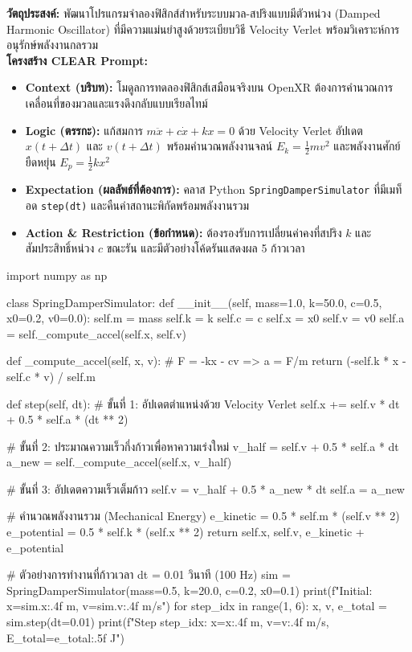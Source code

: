 \begin{aipromptbox}
\textbf{วัตถุประสงค์:} พัฒนาโปรแกรมจำลองฟิสิกส์สำหรับระบบมวล-สปริงแบบมีตัวหน่วง (Damped Harmonic Oscillator) ที่มีความแม่นยำสูงด้วยระเบียบวิธี Velocity Verlet พร้อมวิเคราะห์การอนุรักษ์พลังงานกลรวม\\
\textbf{โครงสร้าง CLEAR Prompt:}
\begin{itemize}[topsep=1pt, itemsep=1pt, leftmargin=1.2em]
    \item \textbf{Context (บริบท):} โมดูลการทดลองฟิสิกส์เสมือนจริงบน OpenXR ต้องการคำนวณการเคลื่อนที่ของมวลและแรงดึงกลับแบบเรียลไทม์
    \item \textbf{Logic (ตรรกะ):} แก้สมการ $m\ddot{x} + c\dot{x} + kx = 0$ ด้วย Velocity Verlet อัปเดต $x(t+\Delta t)$ และ $v(t+\Delta t)$ พร้อมคำนวณพลังงานจลน์ $E_k = \frac{1}{2}mv^2$ และพลังงานศักย์ยืดหยุ่น $E_p = \frac{1}{2}kx^2$
    \item \textbf{Expectation (ผลลัพธ์ที่ต้องการ):} คลาส Python \texttt{SpringDamperSimulator} ที่มีเมท็อด \texttt{step(dt)} และคืนค่าสถานะพิกัดพร้อมพลังงานรวม
    \item \textbf{Action \& Restriction (ข้อกำหนด):} ต้องรองรับการเปลี่ยนค่าคงที่สปริง $k$ และสัมประสิทธิ์หน่วง $c$ ขณะรัน และมีตัวอย่างโค้ดรันแสดงผล 5 ก้าวเวลา
\end{itemize}
\end{aipromptbox}

\begin{codebox}
import numpy as np

class SpringDamperSimulator:
    def __init__(self, mass=1.0, k=50.0, c=0.5, x0=0.2, v0=0.0):
        self.m = mass
        self.k = k
        self.c = c
        self.x = x0
        self.v = v0
        self.a = self._compute_accel(self.x, self.v)

    def _compute_accel(self, x, v):
        # F = -kx - cv => a = F/m
        return (-self.k * x - self.c * v) / self.m

    def step(self, dt):
        # ขั้นที่ 1: อัปเดตตำแหน่งด้วย Velocity Verlet
        self.x += self.v * dt + 0.5 * self.a * (dt ** 2)
        
        # ขั้นที่ 2: ประมาณความเร็วกึ่งก้าวเพื่อหาความเร่งใหม่
        v_half = self.v + 0.5 * self.a * dt
        a_new = self._compute_accel(self.x, v_half)
        
        # ขั้นที่ 3: อัปเดตความเร็วเต็มก้าว
        self.v = v_half + 0.5 * a_new * dt
        self.a = a_new
        
        # คำนวณพลังงานรวม (Mechanical Energy)
        e_kinetic = 0.5 * self.m * (self.v ** 2)
        e_potential = 0.5 * self.k * (self.x ** 2)
        return self.x, self.v, e_kinetic + e_potential

# ตัวอย่างการทำงานที่ก้าวเวลา dt = 0.01 วินาที (100 Hz)
sim = SpringDamperSimulator(mass=0.5, k=20.0, c=0.2, x0=0.1)
print(f"Initial: x={sim.x:.4f} m, v={sim.v:.4f} m/s")
for step_idx in range(1, 6):
    x, v, e_total = sim.step(dt=0.01)
    print(f"Step {step_idx}: x={x:.4f} m, v={v:.4f} m/s, E_total={e_total:.5f} J")
\end{codebox}

